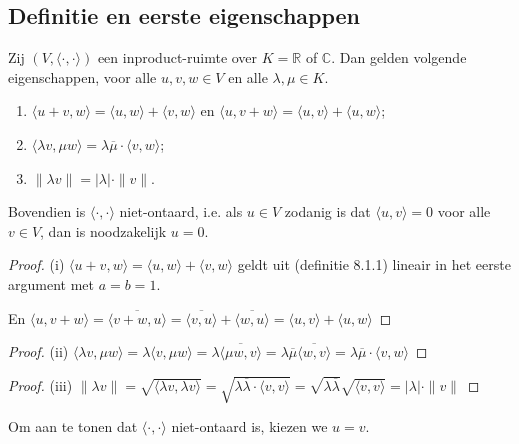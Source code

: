 \subsection{Definitie en eerste eigenschappen}

\begin{lemma}[8.1.2]
    Zij $(V, \langle \cdot, \cdot \rangle)$ een inproduct-ruimte over $K = \mathbb{R}$ of $\mathbb{C}$. Dan gelden volgende eigenschappen, voor alle $u, v, w \in V$ en alle $\lambda, \mu \in K$.
    \begin{enumerate}
        \item[(i)] [\emph{bi-additiviteit}] $\langle u + v, w \rangle = \langle u, w \rangle + \langle v, w \rangle$ en $\langle u, v + w \rangle = \langle u, v \rangle + \langle u, w \rangle$;
        \item[(ii)] [\emph{sesqui-lineariteit}] $\langle \lambda v, \mu w \rangle = \lambda \overline{\mu} \cdot \langle v, w \rangle$;
        \item[(iii)] [\emph{homogeniteit van de norm}] $\|\lambda v\| = |\lambda| \cdot \|v\|$.
    \end{enumerate}
    Bovendien is $\langle \cdot, \cdot \rangle$ niet-ontaard, i.e. als $u \in V$ zodanig is dat $\langle u, v \rangle = 0$ voor alle $v \in V$, dan is noodzakelijk $u = 0$.
\end{lemma}
\begin{proof}(i)
    \(\langle u + v, w \rangle = \langle u, w \rangle + \langle v, w \rangle\) geldt uit (definitie 8.1.1) lineair in het eerste argument met \(a=b=1\).

    En
    \(
        \langle u, v + w \rangle
        = \overline{\langle v + w, u \rangle}
        = \overline{\langle v , u \rangle} + \overline{\langle w, u \rangle}
        =\langle u, v \rangle + \langle u, w \rangle
    \)
\end{proof}
\begin{proof}(ii)
    \(
        \langle \lambda v, \mu w \rangle
        = \lambda \langle  v, \mu w \rangle
        = \lambda \overline{\langle \mu w ,v\rangle}
        = \lambda \overline{\mu} \overline{\langle  w ,v\rangle}
        = \lambda \overline{\mu} \cdot \langle v, w \rangle
    \)
\end{proof}
\begin{proof}(iii)
    \(\|\lambda v\|
    = \sqrt{\langle \lambda v, \lambda v \rangle}
    = \sqrt{\lambda \overline{\lambda} \cdot \langle v, v \rangle}
    = \sqrt{\lambda \overline{\lambda}} \sqrt{ \langle v, v \rangle}
    = |\lambda| \cdot \|v\|\)
\end{proof}
Om aan te tonen dat  $\langle \cdot, \cdot \rangle$ niet-ontaard is, kiezen we \(u = v\).

